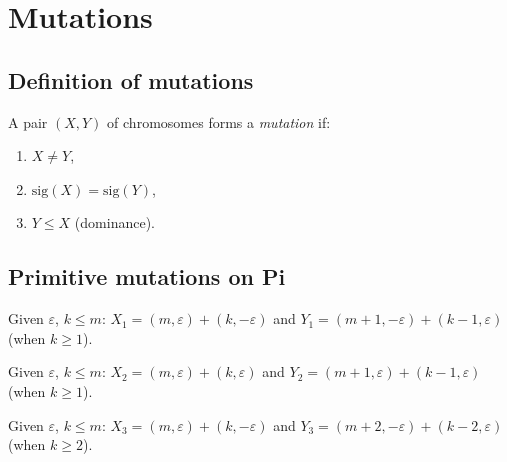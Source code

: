 
\chapter{Mutations}

\section{Definition of mutations}

\begin{definition}[Mutation]
  \label{def:IsMutation}
  \leanok
  A pair $(X, Y)$ of chromosomes forms a \emph{mutation} if:
  \begin{enumerate}
    \item $X \ne Y$,
    \item $\mathrm{sig}(X) = \mathrm{sig}(Y)$,
    \item $Y \le X$ (dominance).
  \end{enumerate}
\end{definition}

\section{Primitive mutations on Pi}

\begin{definition}
  \label{def:Pi.X1Y1}
  \leanok
  Given $\varepsilon$, $k \le m$: $X_1 = (m, \varepsilon) + (k, -\varepsilon)$ and
  $Y_1 = (m+1, -\varepsilon) + (k-1, \varepsilon)$ (when $k \ge 1$).
\end{definition}

\begin{definition}
  \label{def:Pi.X2Y2}
  \leanok
  Given $\varepsilon$, $k \le m$: $X_2 = (m, \varepsilon) + (k, \varepsilon)$ and
  $Y_2 = (m+1, \varepsilon) + (k-1, \varepsilon)$ (when $k \ge 1$).
\end{definition}

\begin{definition}
  \label{def:Pi.X3Y3}
  \leanok
  Given $\varepsilon$, $k \le m$: $X_3 = (m, \varepsilon) + (k, -\varepsilon)$ and
  $Y_3 = (m+2, -\varepsilon) + (k-2, \varepsilon)$ (when $k \ge 2$).
\end{definition}

